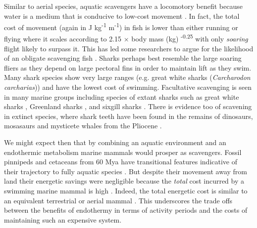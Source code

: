 \documentclass[a4paper,12pt]{article}
\begin{document}
Similar to aerial species, aquatic scavengers have a locomotory benefit because water is a medium that is conducive to low-cost movement \citep{tucker1975energetic}. 
In fact, the total cost of movement (again in J kg\textsuperscript{-1} m\textsuperscript{-1}) in fish is lower than either running or flying where it scales according to 2.15 $\times$ body mass (kg) \textsuperscript{-0.25} \citep{williams1999evolution} with only \textit{soaring} flight likely to surpass it. 
This has led some researchers to argue for the likelihood of an obligate scavenging fish \citep{ruxton2004energetic,ruxton2005searching}. 
Sharks perhaps best resemble the large soaring fliers as they depend on large pectoral fins in order to maintain lift as they swim. 
Many shark species show very large ranges (e.g. great white sharks (\textit{Carcharodon carcharias})) and have the lowest cost of swimming.%
Facultative scavenging is seen in many marine groups including species of extant sharks such as great white sharks \citep[known to feed on whale carcasses;][]{fallows2013white}, Greenland sharks \citep[feeding on seals;][]{watanabe2012slowest}, and sixgill sharks \citep{anderson2016impact}.
There is evidence too of scavening in extinct species, where shark teeth have been found in the remains of dinosaurs, mosasaurs and mysticete whales from the Pliocene \citep[5.3 to 3.6 Mya;]{schwimmer1997scavenging,ehret2009caught}. 



We might expect then that by combining an aquatic environment and an endothermic metabolism marine mammals would prosper as scavengers.
Fossil pinnipeds and cetaceans from 60 Mya %
have transitional features indicative of their trajectory to fully aquatic species \citep{williams1999evolution}.  
But despite their movement away from land their energetic savings were negligible because the \textit{total} cost incurred by a swimming marine mammal is high \citep{williams1999evolution}. 
Indeed, the total energetic cost is similar to an equivalent terrestrial or aerial mammal \citep{williams1999evolution}.
This underscores the trade offs between the benefits of endothermy in terms of activity periods and the costs of maintaining such an expensive system. 
\end{document}

